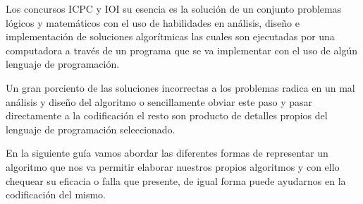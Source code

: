 Los concursos ICPC y IOI su esencia es la solución de un conjunto problemas lógicos y matemáticos con el uso de habilidades en análisis, diseño e implementación de soluciones algorítmicas las cuales son ejecutadas por una computadora a través de un programa que se va implementar con el uso de algún lenguaje de programación.  

Un gran porciento de las soluciones incorrectas a los problemas radica en un mal análisis y diseño del algoritmo o sencillamente obviar este paso y pasar directamente a la codificación el resto son producto de detalles propios del lenguaje de programación seleccionado.    

En la siguiente guía vamos abordar las diferentes formas de representar un algoritmo que nos va permitir elaborar nuestros propios algoritmos y con ello chequear su eficacia o falla que presente, de igual forma puede ayudarnos en la codificación del mismo. 